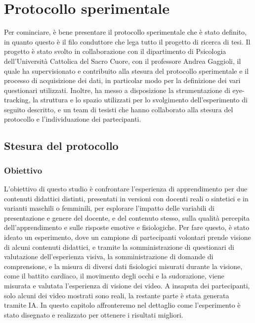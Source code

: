 \chapter{Protocollo sperimentale}

Per cominciare, è bene presentare il protocollo sperimentale che è stato definito, in quanto questo è il filo conduttore che lega tutto il progetto di ricerca di tesi. Il progetto è stato svolto in collaborazione con il dipartimento di Psicologia dell'Università Cattolica del Sacro Cuore, con il professore Andrea Gaggioli, il quale ha supervisionato e contribuito alla stesura del protocollo sperimentale e il processo di acquisizione dei dati, in particolar modo per la definizione dei vari questionari utilizzati. Inoltre, ha messo a disposizione la strumentazione di eye-tracking, la struttura e lo spazio utilizzati per lo svolgimento dell'esperimento di seguito descritto, e un team di tesisti che hanno collaborato alla stesura del protocollo e l'individuazione dei partecipanti.

\section{Stesura del protocollo}

\subsection{Obiettivo}

L'obiettivo di questo studio è confrontare l’esperienza di apprendimento per due contenuti didattici distinti, presentati in versioni con docenti reali o sintetici e in varianti maschili o femminili, per esplorare l’impatto delle variabili di presentazione e genere del docente, e del contenuto stesso, sulla qualità percepita dell’apprendimento e sulle risposte emotive e fisiologiche. Per fare questo, è stato ideato un esperimento, dove un campione di partecipanti volontari prende visione di alcuni contenuti didattici, e tramite la somministrazione di questionari di valutazione dell'esperienza visiva, la somministrazione di domande di comprensione, e la misura di diversi dati fisiologici misurati durante la visione, come il battito cardiaco, il movimento degli occhi e la sudorazione, viene misurata e valutata l'esperienza di visione dei video. A insaputa dei partecipanti, solo alcuni dei video mostrati sono reali, la restante parte è stata generata tramite IA. In questo capitolo affronteremo nel dettaglio come l'esperimento è stato disegnato e realizzato per ottenere i risultati migliori.

